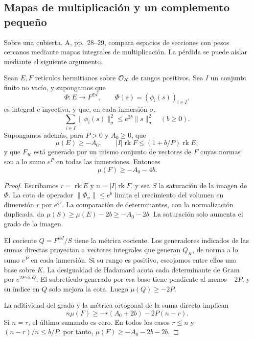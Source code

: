 \subsection{Mapas de multiplicación y un complemento pequeño}

Sobre una cubierta, A, pp.~28--29, compara espacios de secciones
con pesos cercanos mediante mapas integrales de multiplicación.
La pérdida se puede aislar mediante el siguiente argumento.

\begin{lema}
Sean $E,F$ retículos hermitianos sobre $\mathcal{O}_K$ de rangos positivos.
Sea $I$ un conjunto finito no vacío, y supongamos que
\[
 \Phi:E\longrightarrow F^{\oplus I},\qquad
 \Phi(s)=(\phi_i(s))_{i\in I},
\]
es integral e inyectiva, y que, en cada inmersión $\sigma$,
\begin{equation}
 \sum_{i\in I}\|\phi_i(s)\|_\sigma^2
                         \le e^{2b}\|s\|_\sigma^2
 \quad(b\ge0).
 \label{eq:geom-multiplicacion-norma}
\end{equation}
Supongamos además, para $P>0$ y $A_0\ge0$, que
\[
 \mu(E)\ge-A_0,\qquad
 |I|\operatorname{rk}F\le(1+b/P)\operatorname{rk}E,
\]
y que $F_K$ está generado por un mismo conjunto de vectores de
$F$ cuyas normas son a lo sumo $e^P$ en todas las inmersiones.
Entonces
\begin{equation}
                   \mu(F)\ge-A_0-4b.
 \label{eq:geom-multiplicacion-pendiente}
\end{equation}
\label{lem:geom-multiplicacion}
\end{lema}

\begin{proof}
Escribamos $r=\operatorname{rk}E$ y
$n=|I|\operatorname{rk}F$, y sea $S$ la saturación de la imagen
de $\Phi$. La cota de operador $\|\Phi_\sigma\|\le e^b$ limita
el crecimiento del volumen en dimensión $r$ por $e^{br}$.
La comparación de determinantes, con la normalización duplicada,
da $\mu(S)\ge\mu(E)-2b\ge-A_0-2b$.
La saturación solo aumenta el grado de la imagen.

El cociente $Q=F^{\oplus I}/S$ tiene la métrica cociente.
Los generadores indicados de las sumas directas proyectan a
vectores integrales que generan $Q_K$, de norma a lo sumo $e^P$
en cada inmersión. Si su rango es positivo, escojamos entre ellos
una base sobre $K$. La desigualdad de Hadamard acota cada
determinante de Gram por $e^{2P\operatorname{rk}Q}$.
El subretículo generado por esa base tiene pendiente al menos
$-2P$, y su índice en $Q$ solo mejora la cota. Luego
$\mu(Q)\ge-2P$.

La aditividad del grado y la métrica ortogonal de la suma directa
implican
\[
 n\mu(F)
 \ge-r(A_0+2b)-2P(n-r).
\]
Si $n=r$, el último sumando es cero.
En todos los casos $r\le n$ y $(n-r)/n\le b/P$; por tanto,
$\mu(F)\ge-A_0-2b-2b$.
\end{proof}

